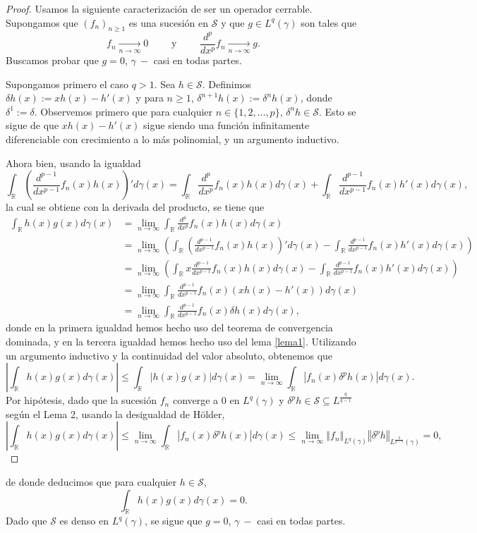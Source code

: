 \documentclass[letterpaper,twoside,12pt]{book}
\newcommand{\R}{\mathbb{R}}
\renewcommand{\S}{\mathcal{S}}
\newcommand{\1}{\mathds{1}}
\newcommand{\abs}[1]{\left\lvert #1 \right\rvert}
\renewcommand{\to}{\rightarrow}
\newcommand{\norm}[1]{\left\Vert #1 \right\Vert}
\theoremstyle{definition}
\theoremstyle{definition}
\theoremstyle{definition}
\theoremstyle{definition}
\theoremstyle{definition}
\theoremstyle{definition}
\theoremstyle{definition}
\begin{document}
 \begin{proof} 
   Usamos la siguiente caracterización de ser un operador cerrable. Supongamos que $(f_n)_{n\geq1}$ es una sucesión en $\S$ y que $g\in L^{q}(\gamma)$ son tales que 
   \[
   f_n\xrightarrow[n\to \infty]{}0 \qquad \text{ y } \qquad \frac{d^{p}}{dx^{p}}f_n\xrightarrow[n\to \infty]{}g.
   \] 
    Buscamos probar que $g=0$, $\gamma \ - $ casi en todas partes.
    
    Supongamos primero el caso $q>1$. Sea $h\in \S$. Definimos $\delta h(x):=xh(x)-h'(x)$ y para $n\geq1$, $\delta^{n+1}h(x):=\delta^{n} h(x)$, donde $\delta^{1}:=\delta$. Observemos primero que para cualquier $n\in \{1,2,...,p\}$, $\delta^{n}h\in \S$. Esto se sigue de que $xh(x)-h'(x)$ sigue siendo una función infinitamente diferenciable con crecimiento a lo más polinomial, y un argumento inductivo.
    
    Ahora bien, usando la igualdad
    \[
    \int_\R \left(\frac{d^{p-1}}{dx^{p-1}}f_n(x)h(x)\right)'d\gamma(x)=\int_\R \frac{d^{p}}{dx^{p}}f_n(x)h(x)d\gamma(x) +\int _\R \frac{d^{p-1}}{dx^{p-1}}f_n(x)h'(x)d\gamma(x),
    \] 
    la cual se obtiene con la derivada del producto, se tiene que 
    \begin{align*}
        \int_{\R}h(x)g(x)d\gamma(x)&=\lim_{n\to\infty}\int_\R \frac{d^{p}}{dx^{p}}f_n(x) h(x) d\gamma(x)\\
        &=\lim_{n\to\infty}\left(\int_\R \left(\frac{d^{p-1}}{dx^{p-1}}f_n(x)h(x)\right)'d\gamma(x)-\int _\R \frac{d^{p-1}}{dx^{p-1}}f_n(x)h'(x)d\gamma(x)\right)\\
        &=\lim_{n\to\infty}\left(\int_\R x\frac{d^{p-1}}{dx^{p-1}}f_n(x)h(x)d\gamma(x)-\int _\R \frac{d^{p-1}}{dx^{p-1}}f_n(x)h'(x)d\gamma(x)\right)\\
        &=\lim_{n\to\infty}\int_\R \frac{d^{p-1}}{dx^{p-1}}f_n(x) \left(xh(x)-h'(x)\right) d\gamma(x)\\
        &=\lim_{n\to\infty}\int_\R \frac{d^{p-1}}{dx^{p-1}}f_n(x) \delta h(x) d\gamma(x),
    \end{align*}
    donde en la primera igualdad hemos hecho uso del teorema de convergencia dominada, y en la tercera igualdad hemos hecho uso del lema \ref{lema1}. Utilizando un argumento inductivo y la continuidad del valor absoluto, obtenemos que 
    \[
        \abs{\int_{\R}h(x)g(x)d\gamma(x)}\leq\int_{\R}\abs{h(x)g(x)} d\gamma(x)=\lim_{n\to\infty}\int_\R \abs{f_n(x) \delta^{p} h(x)} d\gamma(x).
    \]
    Por hipótesis, dado que la sucesión $f_n$ converge a 0 en $L^{q}(\gamma)$ y $\delta^{p}h \in \S\subseteq L^{\frac{q}{q-1}}$ según el Lema 2, usando la desigualdad de Hölder, 
     \[
        \abs{\int_{\R}h(x)g(x)d\gamma(x)}\leq\lim_{n\to\infty}\int_\R |f_n(x) \delta^{p} h(x)| d\gamma(x)\leq \lim_{n\to \infty}\norm{f_n}_{L^{q}(\gamma)}\norm{\delta^{p}h}_{L^{\frac{q}{q-1}}(\gamma)}=0,
     \]
  \end{proof}
  de donde deducimos que para cualquier $h\in \S$, 
  \[
  \int_{\R}h(x)g(x)d\gamma(x)=0.
  \]
  Dado que $\S$ es denso en $L^{q}(\gamma)$, se sigue que $g=0$, $\gamma \ - $ casi en todas partes.
\end{document}
